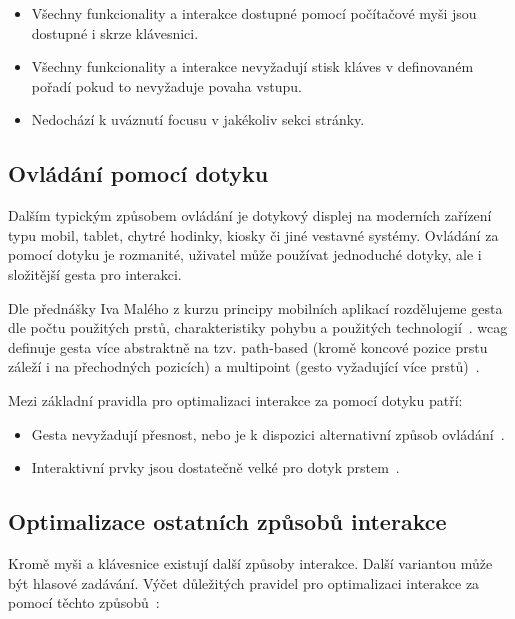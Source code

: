 \begin{itemize}
    \item Všechny funkcionality a interakce dostupné pomocí počítačové myši jsou dostupné i skrze klávesnici.
    \item Všechny funkcionality a interakce nevyžadují stisk kláves v definovaném pořadí pokud to nevyžaduje povaha vstupu.
    \item Nedochází k uváznutí focusu v jakékoliv sekci stránky.
\end{itemize}

\subsection{Ovládání pomocí dotyku}

Dalším typickým způsobem ovládání je dotykový displej na moderních zařízení typu mobil, tablet, chytré hodinky, kiosky či jiné vestavné systémy.
Ovládání za pomocí dotyku je rozmanité, uživatel může používat jednoduché dotyky, ale i složitější gesta pro interakci.


Dle přednášky Iva Malého z kurzu principy mobilních aplikací rozdělujeme gesta dle počtu použitých prstů, charakteristiky pohybu a použitých technologií~\cite{ctu-pda-11}.
\gls{wcag} definuje gesta více abstraktně na tzv. path-based (kromě koncové pozice prstu záleží i na přechodných pozicích) a multipoint (gesto vyžadující více prstů)~\cite{wcag-pointer-gestures}.

Mezi základní pravidla pro optimalizaci interakce za pomocí dotyku patří:

\begin{itemize}
    \item Gesta nevyžadují přesnost, nebo je k dispozici alternativní způsob ovládání~\cite{wcag-pointer-gestures}.
    \item Interaktivní prvky jsou dostatečně velké pro dotyk prstem~\cite{wcag-target-size}.
\end{itemize}

\subsection{Optimalizace ostatních způsobů interakce}


Kromě myši a klávesnice existují další způsoby interakce.
Další variantou může být hlasové zadávání.
Výčet důležitých pravidel pro optimalizaci interakce za pomocí těchto způsobů~\cite{w3-accessibility-principles}:

